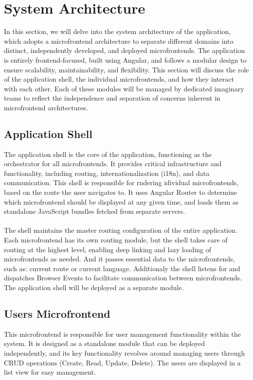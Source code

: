 \section{System Architecture}
In this section, we will delve into the system architecture of the application, which adopts a microfrontend architecture to separate different domains into distinct, independently developed, and deployed microfrontends. The application is entirely frontend-focused, built using Angular, and follows a modular design to ensure scalability, maintainability, and flexibility. This section will discuss the role of the application shell, the individual microfrontends, and how they interact with each other. Each of these modules will be managed by dedicated imaginary teams to reflect the independence and separation of concerns inherent in microfrontend architectures.

\subsection{Application Shell}
The application shell is the core of the application, functioning as the orchestrator for all microfrontends. It provides critical infrastructure and functionality, including routing, internationalization (i18n), and data communication. This shell is responsible for rndering idividual microfrontends, based on the route the user navigates to. It uses Angular Router to determine which microfrontend should be displayed at any given time, and loads them as standalone JavaScript bundles fetched from separate servers. \\\\
The shell maintains the master routing configuration of the entire application. Each microfrontend has its own routing module, but the shell takes care of routing at the highest level, enabling deep linking and lazy loading of microfrontends as needed. And it passes essential data to the microfrontends, such as: current route or current language. Additionaly the shell listens for and dispatches Browser Events to facilitate communication between microfrontends. The application shell will be deployed as a separate module.

\subsection{Users Microfrontend}
This microfrontend is responsible for user management functionality within the system. It is designed as a standalone module that can be deployed independently, and its key functionality revolves around managing users through CRUD operations (Create, Read, Update, Delete). The users are displayed in a list view for easy management.

